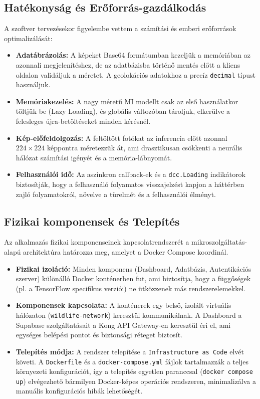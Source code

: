 \documentclass[
	parspace, %
]{elteikthesis}[2024/04/26]
\begin{document}
\subsection{Hatékonyság és Erőforrás-gazdálkodás}
A szoftver tervezésekor figyelembe vettem a számítási és emberi erőforrások optimalizálását:
\begin{itemize}
    \item \textbf{Adatábrázolás:} A képeket Base64 formátumban kezeljük a memóriában az azonnali megjelenítéshez, de az adatbázisba történő mentés előtt a kliens oldalon validáljuk a méretet. A geolokációs adatokhoz a precíz \texttt{decimal} típust használjuk.
    \item \textbf{Memóriakezelés:} A nagy méretű MI modellt csak az első használatkor töltjük be (Lazy Loading), és globális változóban tároljuk, elkerülve a felesleges újra-betöltéseket minden kérésnél.
    \item \textbf{Kép-előfeldolgozás:} A feltöltött fotókat az inferencia előtt azonnal $224 \times 224$ képpontra méretezzük át, ami drasztikusan csökkenti a neurális hálózat számítási igényét és a memória-lábnyomát.
    \item \textbf{Felhasználói idő:} Az aszinkron callback-ek és a \texttt{dcc.Loading} indikátorok biztosítják, hogy a felhasználó folyamatos visszajelzést kapjon a háttérben zajló folyamatokról, növelve a türelmét és a felhasználói élményt.
\end{itemize}

\subsection{Fizikai komponensek és Telepítés}
Az alkalmazás fizikai komponenseinek kapcsolatrendszerét a mikroszolgáltatás-alapú architektúra határozza meg, amelyet a Docker Compose koordinál.

\begin{itemize}
    \item \textbf{Fizikai izoláció:} Minden komponens (Dashboard, Adatbázis, Autentikációs szerver) különálló Docker konténerben fut, ami biztosítja, hogy a függőségek (pl. a TensorFlow specifikus verziói) ne ütközzenek más rendszerelemekkel.
    \item \textbf{Komponensek kapcsolata:} A konténerek egy belső, izolált virtuális hálózaton (\texttt{wildlife-network}) keresztül kommunikálnak. A Dashboard a Supabase szolgáltatásait a Kong API Gateway-en keresztül éri el, ami egységes belépési pontot és biztonsági réteget biztosít.
    \item \textbf{Telepítés módja:} A rendszer telepítése a \texttt{Infrastructure as Code} elvét követi. A \texttt{Dockerfile} és a \texttt{docker-compose.yml} fájlok tartalmazzák a teljes környezeti konfigurációt, így a telepítés egyetlen paranccsal (\texttt{docker compose up}) elvégezhető bármilyen Docker-képes operációs rendszeren, minimalizálva a manuális konfigurációs hibák lehetőségét.
\end{itemize}
\end{document}
